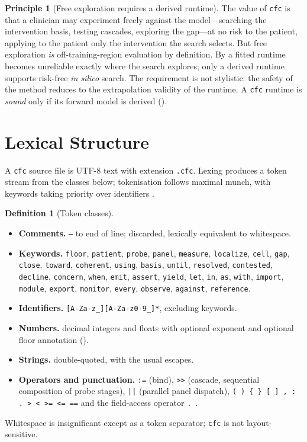 \documentclass[11pt,a4paper]{article}
\theoremstyle{cfcthm}
\theoremstyle{definition}
\newtheorem{definition}[theorem]{Definition}
\newtheorem{principle}[theorem]{Principle}
\theoremstyle{remark}
\newcommand{\cf}[1]{\texttt{#1}}
\begin{document}
\begin{principle}[Free exploration requires a derived runtime]
\label{prin:derived}
The value of \cf{cfc} is that a clinician may experiment freely against the
model---searching the intervention basis, testing cascades, exploring the
gap---at no risk to the patient, applying to the patient only the intervention
the search selects. But free exploration \emph{is} off-training-region
evaluation by definition. By  a fitted runtime becomes
unreliable exactly where the search explores; only a derived runtime supports
risk-free \emph{in silico} search. The requirement is not stylistic: the safety
of the method reduces to the extrapolation validity of the runtime. A \cf{cfc}
runtime is \emph{sound} only if its forward model is derived
().
\end{principle}

\section{Lexical Structure}
\label{sec:lexical}

A \cf{cfc} source file is UTF-8 text with extension \cf{.cfc}. Lexing produces
a token stream from the classes below; tokenisation follows maximal munch, with
keywords taking priority over identifiers \citep{hopcroft2006automata}.

\begin{definition}[Token classes]
\label{def:tokens}
\leavevmode
\begin{itemize}[leftmargin=1.4em,itemsep=1pt]
\item \textbf{Comments.} \cf{--} to end of line; discarded, lexically
equivalent to whitespace.
\item \textbf{Keywords.} \cf{floor}, \cf{patient}, \cf{probe}, \cf{panel},
\cf{measure}, \cf{localize}, \cf{cell}, \cf{gap}, \cf{close}, \cf{toward},
\cf{coherent}, \cf{using}, \cf{basis}, \cf{until}, \cf{resolved},
\cf{contested}, \cf{decline}, \cf{concern}, \cf{when}, \cf{emit}, \cf{assert},
\cf{yield}, \cf{let}, \cf{in}, \cf{as}, \cf{with}, \cf{import}, \cf{module},
\cf{export}, \cf{monitor}, \cf{every}, \cf{observe}, \cf{against},
\cf{reference}.
\item \textbf{Identifiers.} \cf{[A-Za-z\_][A-Za-z0-9\_]*}, excluding keywords.
\item \textbf{Numbers.} decimal integers and floats with optional exponent and
optional floor annotation ().
\item \textbf{Strings.} double-quoted, with the usual escapes.
\item \textbf{Operators and punctuation.} \cf{:=} (bind), \cf{>>} (cascade,
sequential composition of probe stages), \cf{||} (parallel panel dispatch),
\cf{( ) \{ \} [ ] , : . > < >= <= ==} and the field-access operator \cf{.}\ .
\end{itemize}
Whitespace is insignificant except as a token separator; \cf{cfc} is not
layout-sensitive.
\end{definition}
\end{document}
